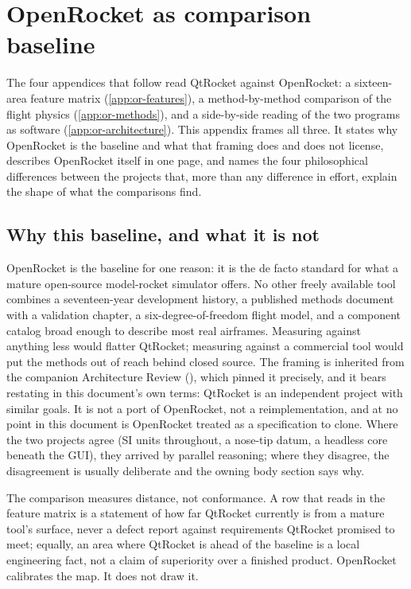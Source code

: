 \section{OpenRocket as comparison baseline}\label{app:or-context}

The four appendices that follow read QtRocket against OpenRocket: a sixteen-area feature
matrix (\cref{app:or-features}), a method-by-method comparison of the flight physics
(\cref{app:or-methods}), and a side-by-side reading of the two programs as software
(\cref{app:or-architecture}). This appendix frames all three. It states why OpenRocket is
the baseline and what that framing does and does not license, describes OpenRocket itself
in one page, and names the four philosophical differences between the projects that, more
than any difference in effort, explain the shape of what the comparisons find.

\subsection{Why this baseline, and what it is not}\label{app:or-context-why}

OpenRocket is the baseline for one reason: it is the de facto standard for what a mature
open-source model-rocket simulator offers. No other freely available tool combines a
seventeen-year development history, a published methods document with a validation chapter, a
six-degree-of-freedom flight model, and a component catalog broad enough to describe most
real airframes. Measuring against anything less would flatter QtRocket; measuring against
a commercial tool would put the methods out of reach behind closed source. The framing is
inherited from the companion Architecture Review (),
which pinned it precisely, and it bears restating in this document's own terms: QtRocket
is an independent project with similar goals. It is not a port of OpenRocket, not a
reimplementation, and at no point in this document is OpenRocket treated as a
specification to clone. Where the two projects agree (SI units throughout, a nose-tip
datum, a headless core beneath the GUI), they arrived by parallel reasoning; where they
disagree, the disagreement is usually deliberate and the owning body section says why.

\begin{designrule}
The comparison measures distance, not conformance. A row that reads \fabsent{} in the
feature matrix is a statement of how far QtRocket currently is from a mature tool's
surface, never a defect report against requirements QtRocket promised to meet; equally, an
area where QtRocket is ahead of the baseline is a local engineering fact, not a claim of
superiority over a finished product. OpenRocket calibrates the map. It does not draw it.
\end{designrule}

